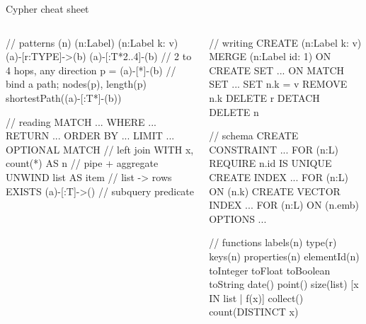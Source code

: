 \documentclass[aspectratio=169, 10pt]{beamer}
\begin{document}
\begin{frame}[fragile]{Cypher cheat sheet}
  \vspace{0.1cm}
  \begin{columns}[T]
      \begin{code}
// patterns
(n)  (n:Label)  (n:Label {k: v})  (a)-[r:TYPE]->(b)
(a)-[:T*2..4]-(b)        // 2 to 4 hops, any direction
p = (a)-[*]-(b)          // bind a path; nodes(p), length(p)
shortestPath((a)-[:T*]-(b))

// reading
MATCH ... WHERE ... RETURN ... ORDER BY ... LIMIT ...
OPTIONAL MATCH            // left join
WITH x, count(*) AS n     // pipe + aggregate
UNWIND list AS item       // list -> rows
EXISTS { (a)-[:T]->() }   // subquery predicate
      \end{code}
      \begin{code}
// writing
CREATE (n:Label {k: v})
MERGE (n:Label {id: 1}) ON CREATE SET ... ON MATCH SET ...
SET n.k = v   REMOVE n.k   DELETE r   DETACH DELETE n

// schema
CREATE CONSTRAINT ... FOR (n:L) REQUIRE n.id IS UNIQUE
CREATE INDEX ... FOR (n:L) ON (n.k)
CREATE VECTOR INDEX ... FOR (n:L) ON (n.emb) OPTIONS {...}

// functions
labels(n) type(r) keys(n) properties(n) elementId(n)
toInteger toFloat toBoolean toString date() point()
size(list) [x IN list | f(x)]  collect() count(DISTINCT x)
      \end{code}
  \end{columns}
\end{frame}
\end{document}
